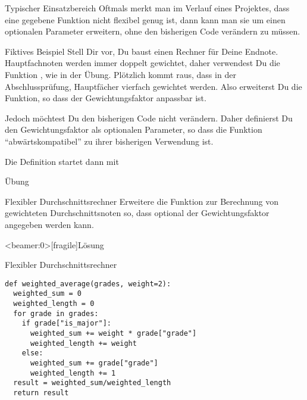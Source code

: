 \begin{frame}
\begin{block}{Typischer Einsatzbereich}
\vspace{2pt}
Oftmals merkt man im Verlauf eines Projektes, dass eine gegebene Funktion nicht flexibel genug ist, dann kann man sie um einen optionalen Parameter erweitern, ohne den bisherigen Code verändern zu müssen. 
\end{block}

\vspace{12pt}

\pause 

\begin{exampleblock}{Fiktives Beispiel}
\vspace{2pt}
Stell Dir vor, Du baust einen Rechner für Deine Endnote. Hauptfachnoten werden immer doppelt gewichtet, daher verwendest Du die Funktion , wie in der Übung. Plötzlich kommt raus, dass in der Abschlussprüfung, Hauptfächer vierfach gewichtet werden. Also erweiterst Du die Funktion, so dass der Gewichtungsfaktor anpassbar ist.

\pause

Jedoch möchtest Du den bisherigen Code nicht verändern. Daher definierst Du den Gewichtungsfaktor als optionalen Parameter, so dass die Funktion \enquote{abwärtskompatibel} zu ihrer bisherigen Verwendung ist.

\pause 
Die Definition startet dann mit  
 
\end{exampleblock}

\end{frame}

\begin{frame}{Übung}

\begin{block}{Flexibler Durchschnittsrechner}
\vspace{2pt}
Erweitere die Funktion zur Berechnung von gewichteten Durchschnittsnoten so, dass optional der Gewichtungsfaktor angegeben werden kann. 	
\end{block}

\end{frame}

\begin{frame}<beamer:0>[fragile]{Lösung}

\begin{solutionblock}{Flexibler Durchschnittsrechner}
\begin{verbatim}
def weighted_average(grades, weight=2): 
  weighted_sum = 0
  weighted_length = 0
  for grade in grades: 
    if grade["is_major"]: 
      weighted_sum += weight * grade["grade"]
      weighted_length += weight
    else:
      weighted_sum += grade["grade"]
      weighted_length += 1
  result = weighted_sum/weighted_length
  return result 
\end{verbatim}
\end{solutionblock}

\end{frame}

